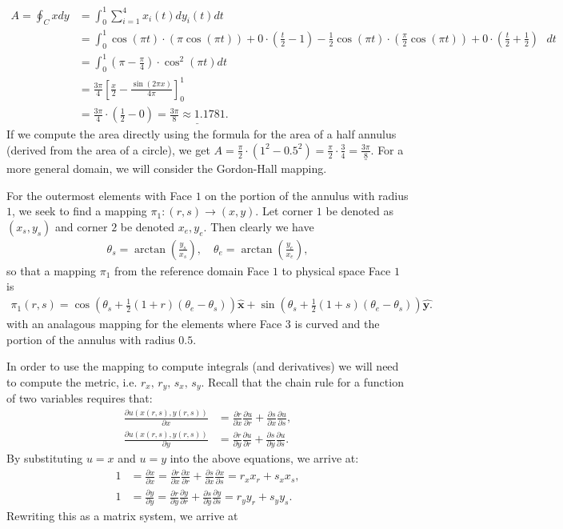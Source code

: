 \documentclass{article}
\newcommand{\pdiff}[2]{\frac{\partial {#1}}{\partial {#2}}}
\begin{document}
  \begin{align*}
    A = \oint_{C}xdy & = \int_{0}^{1}\sum_{i=1}^{4}x_i(t)dy_i(t)dt \\
    & = \int_{0}^{1}\cos(\pi t)\cdot(\pi \cos(\pi t))+0\cdot(\frac{t}{2}-1)-\frac{1}{2}\cos(\pi t)\cdot(\frac{\pi}{2} \cos(\pi t))+0\cdot(\frac{t}{2}+\frac{1}{2})\mbox{ }dt \\
    & =\int_{0}^{1}(\pi-\frac{\pi}{4})\cdot \cos^2(\pi t)dt\\ 
    & =\frac{3\pi}{4}\left[\frac{x}{2}-\frac{\sin(2\pi x)}{4\pi}\right]_0^1 \\
    & =\frac{3\pi}{4}\cdot(\frac{1}{2}-0)=\underline{\frac{3\pi}{8}\approx1.1781}.  
  \end{align*}
\noindent If we compute the area directly using the formula for the area of a half annulus (derived from the area of a circle), we get $A=\frac{\pi}{2}\cdot(1^2-0.5^2)=\frac{\pi}{2}\cdot\frac{3}{4}=\underline{\frac{3\pi}{8}}$. For a more general domain, we will consider the Gordon-Hall mapping.

 For the outermost elements with Face $1$ on the portion of the annulus with radius $1$, we seek to find a mapping $\pi_1 : (r,s) \to (x,y)$. Let corner $1$ be denoted as $(x_s,y_s)$ and corner $2$ be denoted $x_e,y_e$. Then clearly we have 
  \begin{align*}
    \theta _s = \arctan \left(\frac{y_s}{x_s}\right), \quad \theta_e = \arctan \left(\frac{y_e}{x_e}\right),
  \end{align*}
so that a mapping $\pi_1$ from the reference domain Face $1$ to physical space Face $1$ is
  \begin{align*}
    \pi_1(r,s) = \cos \left( \theta_s + \frac{1}{2}(1 + r)(\theta_e - \theta_s) \right) \hat{\textbf{x}} + \sin \left( \theta_s + \frac{1}{2}(1 + s)(\theta_e - \theta_s) \right) \hat{\textbf{y.}}
  \end{align*}
with an analagous mapping for the elements where Face $3$ is curved and the portion of the annulus with radius $0.5$.

In order to use the mapping to compute integrals (and derivatives) we will need to compute the metric, i.e. $r_x, \, r_y, \, s_x, \, s_y$. Recall that the chain rule for a function of two variables requires that:
  \begin{align*}
    \pdiff{u(x(r,s),y(r,s))}{x} & = \pdiff{r}{x}\pdiff{u}{r} + \pdiff{s}{x} \pdiff{u}{s}, \\
    \pdiff{u(x(r,s),y(r,s))}{y} & = \pdiff{r}{y}\pdiff{u}{r} + \pdiff{s}{y} \pdiff{u}{s}.
  \end{align*}
By substituting $u = x$ and $u = y$ into the above equations, we arrive at:
  \begin{align*}
    1 & = \pdiff{x}{x} = \pdiff{r}{x}\pdiff{x}{r} + \pdiff{s}{x} \pdiff{x}{s} = r_x x_r + s_x x_s, \\
    1 & = \pdiff{y}{y}  = \pdiff{r}{y}\pdiff{y}{r} + \pdiff{s}{y} \pdiff{y}{s} = r_y y_r + s_y y_s.  
  \end{align*}
Rewriting this as a matrix system, we arrive at 
\end{document}
